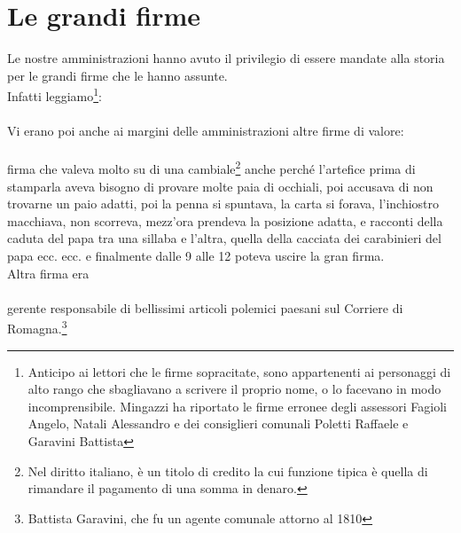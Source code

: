 
\chapter{Le grandi firme}
Le nostre amministrazioni hanno avuto il privilegio di essere mandate alla storia per le grandi firme che le hanno assunte.\\
Infatti leggiamo\footnote{Anticipo ai lettori che le firme sopracitate, sono appartenenti ai personaggi di alto rango che sbagliavano a scrivere il proprio nome, o lo facevano in modo incomprensibile. Mingazzi ha riportato le firme erronee degli assessori Fagioli Angelo, Natali Alessandro e dei consiglieri comunali Poletti Raffaele e Garavini Battista}:
\\   
\normalfont
\\Vi erano poi anche ai margini delle amministrazioni altre firme di valore:
\\ \\
\normalfont
firma che valeva molto su di una cambiale\footnote{Nel diritto italiano, è un titolo di credito la cui funzione tipica è quella di rimandare il pagamento di una somma in denaro.} anche perché l'artefice prima di stamparla aveva bisogno di provare molte paia di occhiali, poi accusava di non trovarne un paio adatti, poi la penna si spuntava, la carta si forava, l'inchiostro macchiava, non scorreva, mezz'ora prendeva la posizione adatta, e racconti della caduta del papa tra una sillaba e l'altra, quella della cacciata dei carabinieri del papa ecc. ecc. e finalmente dalle 9 alle 12 poteva uscire la gran firma. \\
Altra firma era
\\ \\ \normalfont
gerente responsabile di bellissimi articoli polemici paesani sul Corriere di Romagna.\footnote{Battista Garavini, che fu un agente comunale attorno al 1810}




